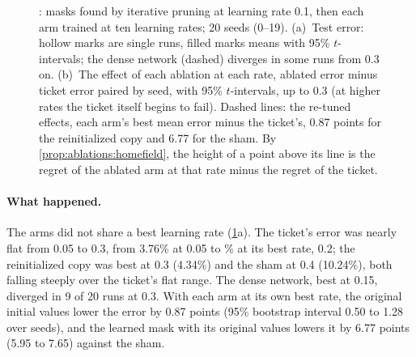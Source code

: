 \begin{refsection}
\begin{figure}[t]
\begin{fullwidth}
\par\smallskip
{}
\caption{: masks found by iterative pruning at learning rate 0.1, then each arm trained at ten learning rates; 20 seeds (0--19). (a)~Test error: hollow marks are single runs, filled marks means with 95\% $t$-intervals; the dense network (dashed) diverges in some runs from 0.3 on. (b)~The effect of each ablation at each rate, ablated error minus ticket error paired by seed, with 95\% $t$-intervals, up to 0.3 (at higher rates the ticket itself begins to fail). Dashed lines: the re-tuned effects, each arm's best mean error minus the ticket's, 0.87 points for the reinitialized copy and 6.77 for the sham. By \cref{prop:ablations:homefield}, the height of a point above its line is the regret of the ablated arm at that rate minus the regret of the ticket.}
\label{fig:ablations:homefield}
\end{fullwidth}
\end{figure}

\paragraph{What happened.} The arms did not share a best learning rate (\cref{fig:ablations:homefield}a). The ticket's error was nearly flat from 0.05 to 0.3, from 3.76\% at 0.05 to \% at its best rate, 0.2; the reinitialized copy was best at 0.3 (4.34\%) and the sham at 0.4 (10.24\%), both falling steeply over the ticket's flat range. The dense network, best at 0.15, diverged in 9 of 20 runs at 0.3. With each arm at its own best rate, the original initial values lower the error by 0.87 points (95\% bootstrap interval 0.50 to 1.28 over seeds), and the learned mask with its original values lowers it by 6.77 points (5.95 to 7.65) against the sham.


\end{refsection}
